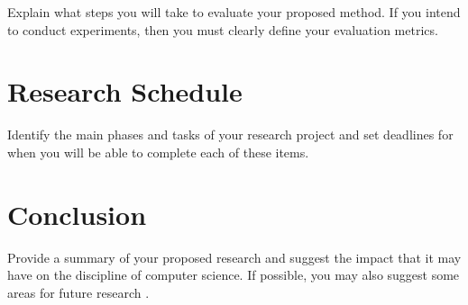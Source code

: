 \documentclass[11pt]{article}
\begin{document}

Explain what steps you will take to evaluate your proposed method.  If
you intend to conduct experiments, then you must clearly define your
evaluation metrics.

\vspace*{-.1in}
\section{Research Schedule}
\label{sec:schedule}
\vspace*{-.1in}

Identify the main phases and tasks of your research project and set
deadlines for when you will be able to complete each of these items.

\vspace*{-.1in}
\section{Conclusion}
\label{sec:conclusion}
\vspace*{-.1in}


Provide a summary of your proposed research and suggest the impact
that it may have on the discipline of computer science.  If possible,
you may also suggest some areas for future research \cite{jia2011analysis}.



\end{document}
